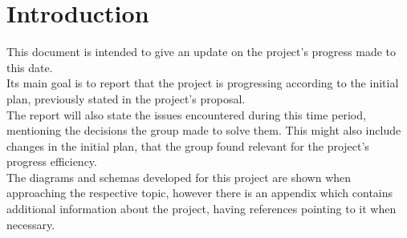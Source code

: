%
%

\chapter{Introduction}

This document is intended to give an update on the project's progress made to this date.\\

Its main goal is to report that the project is progressing according to the initial plan, previously stated 
in the project's proposal.\\

The report will also state the issues encountered during this time period, mentioning the 
decisions the group made to solve them. This might also include changes in the
initial plan, that the group found relevant for the project's progress efficiency.\\

The diagrams and schemas developed for this project are shown when approaching the respective topic,
however there is an appendix which contains additional information about the project, having 
references pointing to it when necessary.